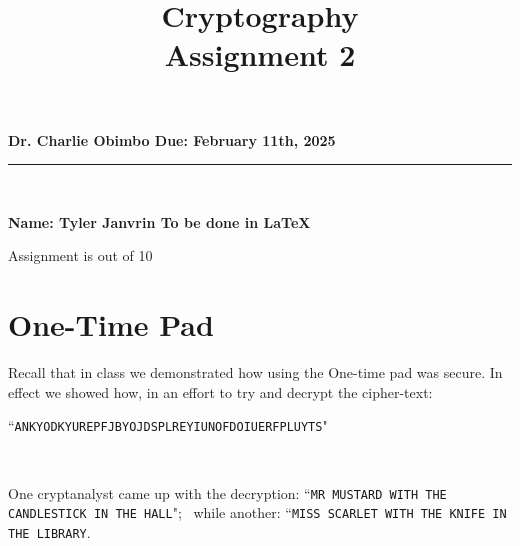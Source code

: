 \documentclass[12pt,emtex]{article}
\begin{document}
\title{\vspace{-25mm} \bf Cryptography 
\\ Assignment 2}
\date{}
\maketitle

\vspace{-20mm}

\begin{center}
	{\bf Dr. Charlie Obimbo \hfill Due:  February 11th, 2025}
\end{center}

\hrule

\vspace{6mm}

\

\noindent
{\bf Name: Tyler Janvrin \hspace{20mm} \hfill 
    To be done  in \LaTeX
}

\hfill Assignment is out of 10



	
\section{One-Time Pad}


Recall that in class we demonstrated how using the One-time pad was secure. In effect we showed how, in an effort to try and decrypt the cipher-text:

\medskip

``\texttt{ANKYODKYUREPFJBYOJDSPLREYIUNOFDOIUERFPLUYTS}"

\

\noindent
One cryptanalyst came up with the decryption:
``\texttt{MR MUSTARD WITH THE CANDLESTICK IN THE HALL}"; 
\
while another: 
``\texttt{MISS SCARLET WITH THE KNIFE IN THE LIBRARY}.
\end{document}
